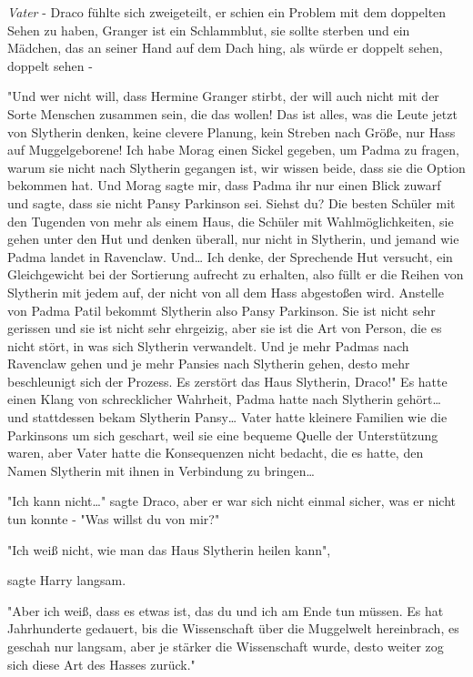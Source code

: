 {\emph{Vater} - Draco fühlte sich zweigeteilt, er schien ein Problem mit dem doppelten Sehen zu haben, Granger ist ein Schlammblut, sie sollte sterben und ein Mädchen, das an seiner Hand auf dem Dach hing, als würde er doppelt sehen, doppelt sehen -

"Und wer nicht will, dass Hermine Granger stirbt, der will auch nicht mit der Sorte Menschen zusammen sein, die das wollen! Das ist alles, was die Leute jetzt von Slytherin denken, keine clevere Planung, kein Streben nach Größe, nur Hass auf Muggelgeborene! Ich habe Morag einen Sickel gegeben, um Padma zu fragen, warum sie nicht nach Slytherin gegangen ist, wir wissen beide, dass sie die Option bekommen hat. Und Morag sagte mir, dass Padma ihr nur einen Blick zuwarf und sagte, dass sie nicht Pansy Parkinson sei. Siehst du? Die besten Schüler mit den Tugenden von mehr als einem Haus, die Schüler mit Wahlmöglichkeiten, sie gehen unter den Hut und denken überall, nur nicht in Slytherin, und jemand wie Padma landet in Ravenclaw. Und… Ich denke, der Sprechende Hut versucht, ein Gleichgewicht bei der Sortierung aufrecht zu erhalten, also füllt er die Reihen von Slytherin mit jedem auf, der nicht von all dem Hass abgestoßen wird. Anstelle von Padma Patil bekommt Slytherin also Pansy Parkinson. Sie ist nicht sehr gerissen und sie ist nicht sehr ehrgeizig, aber sie ist die Art von Person, die es nicht stört, in was sich Slytherin verwandelt. Und je mehr Padmas nach Ravenclaw gehen und je mehr Pansies nach Slytherin gehen, desto mehr beschleunigt sich der Prozess. Es zerstört das Haus Slytherin, Draco!" Es hatte einen Klang von schrecklicher Wahrheit, Padma hatte nach Slytherin gehört… und stattdessen bekam Slytherin Pansy… Vater hatte kleinere Familien wie die Parkinsons um sich geschart, weil sie eine bequeme Quelle der Unterstützung waren, aber Vater hatte die Konsequenzen nicht bedacht, die es hatte, den Namen Slytherin mit ihnen in Verbindung zu bringen…

"Ich kann nicht…" sagte Draco, aber er war sich nicht einmal sicher, was er nicht tun konnte - "Was willst du von mir?"

"Ich weiß nicht, wie man das Haus Slytherin heilen kann",

sagte Harry langsam.

"Aber ich weiß, dass es etwas ist, das du und ich am Ende tun müssen. Es hat Jahrhunderte gedauert, bis die Wissenschaft über die Muggelwelt hereinbrach, es geschah nur langsam, aber je stärker die Wissenschaft wurde, desto weiter zog sich diese Art des Hasses zurück."

}
